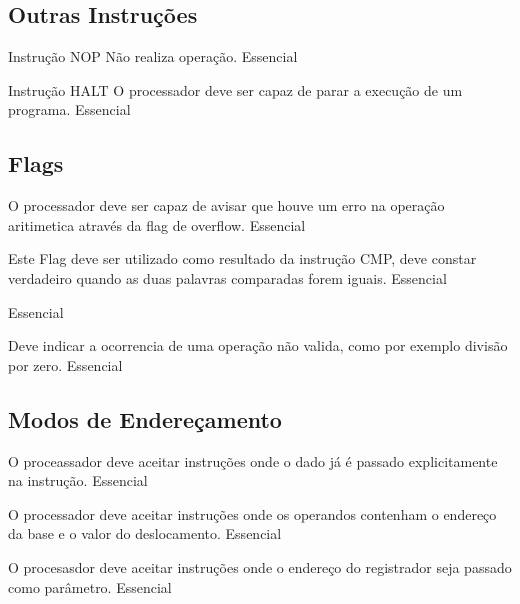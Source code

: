 \documentclass{article}
\begin{document}
    \subsection{Outras Instruções}

    \begin{functional}

      \requirement
      {Instrução NOP}
      {Não realiza operação.}
      {Essencial}

      \requirement
      {Instrução HALT}
      {O processador deve ser capaz de parar a execução de um programa.}
      {Essencial}

    \end{functional}

    \subsection{Flags}

    \begin{functional}

      {O processador deve ser capaz de avisar que houve um erro na operação aritimetica através da flag de overflow.}
      {Essencial}

      {Este Flag deve ser utilizado como resultado da instrução CMP, deve constar verdadeiro quando as duas palavras comparadas forem iguais.}
      {Essencial}

      {}
      {Essencial}

      {Deve indicar a ocorrencia de uma operação não valida, como por exemplo divisão por zero.}
      {Essencial}

     \end{functional}

     \subsection{Modos de Endereçamento}

    \begin{functional}

      {O proceassador deve aceitar instruções onde o dado já é passado explicitamente na instrução.}
      {Essencial}


      {O processador deve aceitar instruções onde os operandos contenham o endereço da base e o valor do deslocamento.}
      {Essencial}

      {O procesasdor deve aceitar instruções onde o endereço do registrador seja passado como parâmetro.}
      {Essencial}

     \end{functional}
\end{document}
